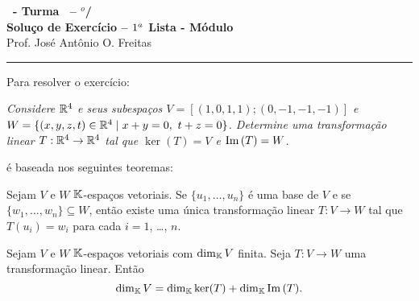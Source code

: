 \documentclass[12pt]{exam}
\begin{document}
    \begin{center}
        {\Large\bf \disciplina\ - Turma \turma\ -- \semestre$^{o}$/\ano} \\ \vspace{9pt} {\large\bf
            Solu\c{c}o de Exercício -- $1^a$ Lista - Módulo \numeromodulo}\\ \vspace{9pt} Prof. José Antônio O. Freitas
    \end{center}
    \hrule

    Para resolver o exercício:
    \begin{center}
        \begin{flushleft}
            \textit{Considere $\mathbb{R}^4$ e seus subespa\c{c}os $V = [(1,0,1,1);(0,-1,-1,-1)]$ e $W = \{(x,y,z,t) \in \mathbb{R}^4 \mid x + y = 0,\ t + z = 0\}$. Determine uma transforma\c{c}ão linear $T : \mathbb{R}^4 \to \mathbb{R}^4$ tal que $\ker(T) = V$ e ${\rm Im\,}(T) = W$.}
         \end{flushleft}
    \end{center}
    é baseada nos seguintes teoremas:

    \begin{tcolorbox}[colback=green!30, colframe=green!80!blue, title=Teorema]
        Sejam $V$ e $W$ $\mathbb{K}$-espa\c{c}os vetoriais. Se $\{u_1, \dots, u_n\}$ é uma base de $V$ e se $\{w_1, \dots, w_n\} \subseteq W$, então existe uma única transforma\c{c}ão linear $T \colon V \to W$ tal que $T(u_i) = w_i$ para cada $i = 1$, \dots, $n$.
    \end{tcolorbox}

    \begin{tcolorbox}[colback=green!30, colframe=green!80!blue, title=Teorema do Núcleo e da Imagem]
        Sejam $V$ e $W$ $\mathbb{K}$-espa\c{c}os vetoriais com $\dim_{\mathbb{K}}V$ finita. Seja $T : V \to W$ uma transforma\c{c}ão linear. Então
        \[
        \dim_{\mathbb{K}}V = \dim_{\mathbb{K}}\ker(T) + \dim_{\mathbb{K}}{\rm Im\,}(T).
        \]
    \end{tcolorbox}
\end{document}
